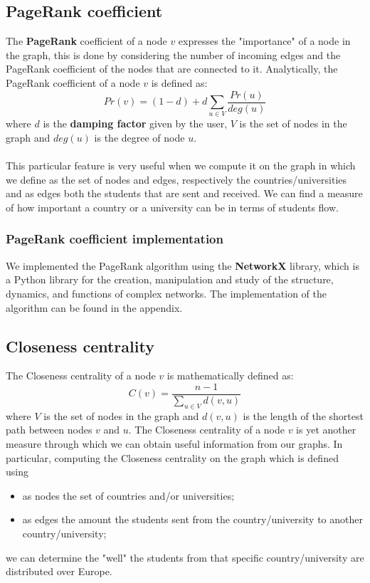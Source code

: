     \subsection*{PageRank coefficient}

    The \textbf{PageRank} coefficient of a node $v$ expresses the "importance" of a node in the graph, this is done by considering the 
    number of incoming edges and the PageRank coefficient of the nodes that are connected to it. Analytically, the PageRank coefficient of a node $v$ is defined as:
    \begin{equation}
        Pr(v) = (1-d) + d \sum_{u \in V} \frac{Pr(u)}{deg(u)}
    \end{equation}
    where $d$ is the \textbf{damping factor} given by the user, $V$ is the set of nodes in the graph and $deg(u)$ is the degree of node $u$.
    \\\\
    This particular feature is very useful when we compute it on the graph in which we define as the set of nodes and edges, respectively the 
    countries/universities and as edges both the students that are sent and received. We can find a measure of how important a country or a 
    university can be in terms of students flow.
    \subsubsection*{PageRank coefficient implementation}
    We implemented the PageRank algorithm using the \textbf{NetworkX} library, which is a Python library for the creation, 
    manipulation and study of the structure, dynamics, and functions of complex networks. The implementation of the algorithm can be found in the appendix.

    \subsection*{Closeness centrality}
    The Closeness centrality of a node $v$ is mathematically defined as:
    \begin{equation}
        C(v) = \frac{n-1}{\sum_{u \in V} d(v, u)}
    \end{equation}
    where $V$ is the set of nodes in the graph and $d(v, u)$ is the length of the shortest path between nodes $v$ and $u$.
    The Closeness centrality of a node $v$ is yet another measure through which we can obtain useful information from our graphs. In particular, 
    computing the Closeness centrality on the graph which is defined using 
    \begin{itemize}
        \item as nodes the set of countries and/or universities;
        \item as edges the amount the students sent from the country/university to another country/university;
    \end{itemize}
    we can determine the "well" the students from that specific country/university are distributed over Europe.
